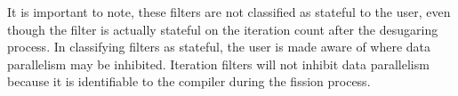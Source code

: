 It is important to note, these filters are not classified as stateful to the user, even though the filter is actually stateful on the iteration count after the desugaring process.  In classifying filters as stateful, the user is made aware of where data parallelism may be inhibited.  Iteration filters will not inhibit data parallelism because it is identifiable to the compiler during the fission process.   

